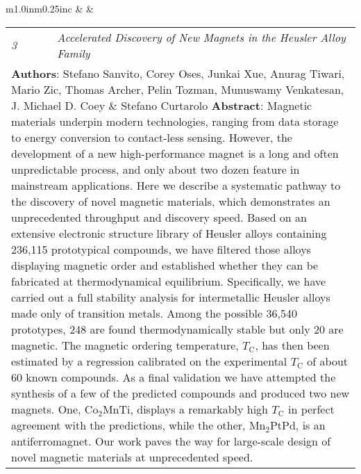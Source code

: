 \documentclass[11pt]{article}
\begin{document}
\vspace{0.25cm}

\begin{tabular}{m{1.0in}m{0.25in}c}
 & & 
\begin{tabular}{m{0.3in}m{0.15in}m{4.3in}}
\textit{\small{3}} & & \textit{Accelerated Discovery of New Magnets in the Heusler Alloy Family} \\ \multicolumn{3}{p{4.75in}}{\footnotesize{\textbf{Authors}: Stefano Sanvito, \textcolor{NavyBlue}{Corey Oses}, Junkai Xue, Anurag Tiwari, Mario Zic, Thomas Archer, Pelin Tozman, Munuswamy Venkatesan, J. Michael D. Coey \& Stefano Curtarolo \newline \textbf{Abstract}: Magnetic materials underpin modern technologies, ranging from data storage to energy conversion to contact-less sensing. However, the development of a new high-performance magnet is a long and often unpredictable process, and only about two dozen feature in mainstream applications. Here we describe a systematic pathway to the discovery of novel magnetic materials, which demonstrates an unprecedented throughput and discovery speed. Based on an extensive electronic structure library of Heusler alloys containing 236,115 prototypical compounds, we have filtered those alloys displaying magnetic order and established whether they can be fabricated at thermodynamical equilibrium. Specifically, we have carried out a full stability analysis for intermetallic Heusler alloys made only of transition metals. Among the possible 36,540 prototypes, 248 are found thermodynamically stable but only 20 are magnetic. The magnetic ordering temperature, $T_{\mathrm{C}}$, has then been estimated by a regression calibrated on the experimental $T_{\mathrm{C}}$ of about 60 known compounds. As a final validation we have attempted the synthesis of a few of the predicted compounds and produced two new magnets. One, Co$_{2}$MnTi, displays a remarkably high $T_{\mathrm{C}}$ in perfect agreement with the predictions, while the other, Mn$_{2}$PtPd, is an antiferromagnet. Our work paves the way for large-scale design of novel magnetic materials at unprecedented speed.}} 
\end{tabular} \\ 
\end{tabular}

\vspace{0.25cm}

\noindent\hspace{0cm}{\Large 2015}
\end{document}
